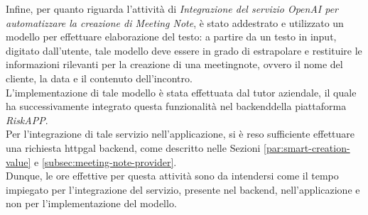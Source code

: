 Infine, per quanto riguarda l'attività di \emph{Integrazione del servizio OpenAI per automatizzare la creazione di Meeting Note}, è stato addestrato e utilizzato un modello per effettuare elaborazione del testo: a partire da un testo in input, digitato dall'utente, tale modello deve essere in grado di estrapolare e restituire le informazioni rilevanti per la creazione di una \gls{meetingnote}\glsoccur, ovvero il nome del cliente, la data e il contenuto dell'incontro.\\
L'implementazione di tale modello è stata effettuata dal tutor aziendale, il quale ha successivamente integrato questa funzionalità nel \gls{backend}\glsoccur della piattaforma \emph{RiskAPP}.\\
Per l'integrazione di tale servizio nell'applicazione, si è reso sufficiente effettuare una richiesta \gls{httpg}\glsoccur al \gls{backend}\glsoccur, come descritto nelle Sezioni \ref{par:smart-creation-value} e \ref{subsec:meeting-note-provider}. \\
Dunque, le ore effettive per questa attività sono da intendersi come il tempo impiegato per l'integrazione del servizio, presente nel \gls{backend}\glsoccur, nell'applicazione e non per l'implementazione del modello.\\

